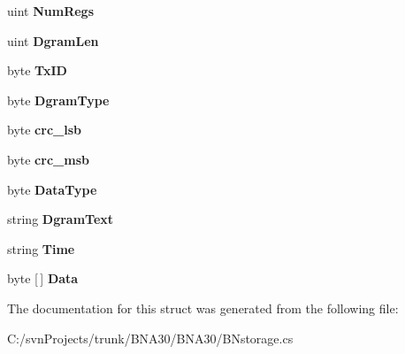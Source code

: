 \begin{DoxyCompactItemize}
uint {\bfseries Num\+Regs}
\item 
\mbox{\label{struct_b_n_a30_1_1c_p_a_c_k_e_t_1_1orginal_p_a_c_k_e_tstruct_a337d47ec9c969448fb0142ac9210e453}} 
uint {\bfseries Dgram\+Len}
\item 
\mbox{\label{struct_b_n_a30_1_1c_p_a_c_k_e_t_1_1orginal_p_a_c_k_e_tstruct_a18aae5718fb3595d4f74e52532d50075}} 
byte {\bfseries Tx\+ID}
\item 
\mbox{\label{struct_b_n_a30_1_1c_p_a_c_k_e_t_1_1orginal_p_a_c_k_e_tstruct_a8e266c2da42fcfafc8c8697f7feaaa3f}} 
byte {\bfseries Dgram\+Type}
\item 
\mbox{\label{struct_b_n_a30_1_1c_p_a_c_k_e_t_1_1orginal_p_a_c_k_e_tstruct_a0c5e64d50f429ba49ccb92945289986a}} 
byte {\bfseries crc\+\_\+lsb}
\item 
\mbox{\label{struct_b_n_a30_1_1c_p_a_c_k_e_t_1_1orginal_p_a_c_k_e_tstruct_a83e81ed508f58457f3722c9775f069d7}} 
byte {\bfseries crc\+\_\+msb}
\item 
\mbox{\label{struct_b_n_a30_1_1c_p_a_c_k_e_t_1_1orginal_p_a_c_k_e_tstruct_a8ba306bb4bddcc1b5a21076701dbd720}} 
byte {\bfseries Data\+Type}
\item 
\mbox{\label{struct_b_n_a30_1_1c_p_a_c_k_e_t_1_1orginal_p_a_c_k_e_tstruct_a44b8bb6c0988a61e6ae22dd96c141876}} 
string {\bfseries Dgram\+Text}
\item 
\mbox{\label{struct_b_n_a30_1_1c_p_a_c_k_e_t_1_1orginal_p_a_c_k_e_tstruct_aaea26885d7a4206351684de9054978d9}} 
string {\bfseries Time}
\item 
\mbox{\label{struct_b_n_a30_1_1c_p_a_c_k_e_t_1_1orginal_p_a_c_k_e_tstruct_a709f509d06915d7ab69ce53acd060cce}} 
byte \mbox{[}$\,$\mbox{]} {\bfseries Data}
\end{DoxyCompactItemize}


The documentation for this struct was generated from the following file\+:\begin{DoxyCompactItemize}
\item 
C\+:/svn\+Projects/trunk/\+B\+N\+A30/\+B\+N\+A30/B\+Nstorage.\+cs\end{DoxyCompactItemize}
